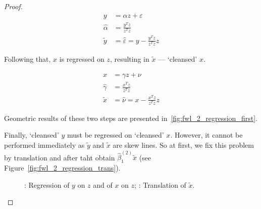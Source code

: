 \begin{proof}
\begin{equation}\label{eq:fwl_2_y_clean}
\begin{aligned}
y &= \alpha z + \varepsilon \\
\hat\alpha &= \frac{y^T z}{z^T z} \\
\tilde{y} &= \hat\varepsilon = y - \frac{y^T z}{z^T z}z
\end{aligned}
\end{equation}

Following that, $x$ is regressed on $z$, resulting in $\tilde{x}$ — `cleansed' $x$.

\begin{equation}\label{eq:fwl_2_x_clean}
\begin{aligned}
x &= \gamma z + \nu \\
\hat\gamma &= \frac{x^T z}{z^T z} \\
\tilde{x} &= \hat\nu = x - \frac{x^T z}{z^T z}z
\end{aligned}
\end{equation}

Geometric results of these two steps are presented in~\ref{fig:fwl_2_regression_first}.

Finally, `cleansed' $y$ must be regressed on `cleansed' $x$.
However, it cannot be performed immediately as $\tilde{y}$ and $\tilde{x}$ are skew lines.
So at first, we fix this problem by translation and after taht obtain
$\hat\beta_1^{(2)}\tilde x$ (see Figure~\ref{fig:fwl_2_regression_trans}).

\begin{figure}[ht!]
\begin{center}
\hspace{4ex}
\caption{: Regression of $y$ on $z$ and of $x$ on $z$;
: Translation of $\tilde{x}$.}
\end{center}
\end{figure}


\end{proof}
